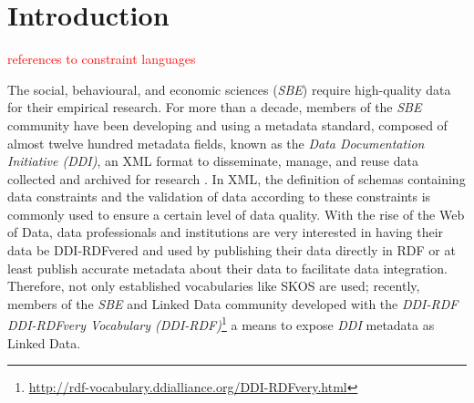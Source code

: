 \documentclass[conference]{IEEEtran}
\begin{document}
\section{Introduction}


 


\textcolor{red}{references to constraint languages}

The social, behavioural, and economic sciences (\emph{SBE}) require high-quality data for their empirical research. For more than a decade, members of the \emph{SBE} community have been developing and using a
metadata standard, composed of almost twelve hundred metadata fields, known as the \emph{Data Documentation Initiative (DDI)},
an XML format to disseminate, manage,
and reuse data collected and archived for research \cite{Vardigan2008}. 
In XML, the definition of schemas containing data constraints and the validation of data according to these constraints is commonly used to ensure a certain level of data quality.
With the rise of the Web of Data, data professionals and institutions are very interested in having their data be DDI-RDFvered and used by publishing their data directly in RDF or at least publish accurate metadata about their data to facilitate data integration. Therefore, not only established vocabularies like SKOS are used; 
recently, members of the \emph{SBE} and Linked Data community developed with the \emph{DDI-RDF DDI-RDFvery Vocabulary (DDI-RDF)}\footnote{\url{http://rdf-vocabulary.ddialliance.org/DDI-RDFvery.html}} a means to expose \emph{DDI} metadata as Linked Data. 
\end{document}
